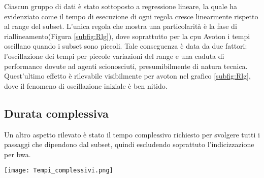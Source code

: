 Ciascun gruppo di dati è stato sottoposto a regressione lineare, la quale ha evidenziato come il tempo di esecuzione di ogni regola cresce linearmente rispetto al range del subset.
L'unica regola che mostra una particolarità è la fase di riallineamento(Figura \ref{subfig:Rlg}), dove soprattutto per la cpu Avoton i tempi oscillano quando i subset sono piccoli. 
Tale conseguenza è data da due fattori: l'oscillazione dei tempi per piccole variazioni del range e una caduta di performance dovute ad agenti scionosciuti, presumibilmente di natura tecnica.
Quest'ultimo effetto è rilevabile visibilmente per avoton nel grafico \ref{subfig:Rlg}, dove il fenomeno di oscillazione iniziale è ben nitido.




\subsection{Durata complessiva}
Un altro aspetto rilevato è stato il tempo complessivo richiesto per svolgere tutti i passaggi che dipendono dal subset, quindi escludendo soprattuto l'indicizzazione per bwa.

\begin{table}[H]
  \begin{minipage}[b]{0.4\linewidth}
	\centering
	\texttt{[image: Tempi\_complessivi.png]}	
	\label{fig:Ttot}
  \end{minipage}
  \hfill  
  \begin{varwidth}[b]{0.4\linewidth}
    \centering
    \caption{Pendenze per i tempi complessivi.}
    \label{tab:Ttot}
  \end{varwidth}%
\end{table}

